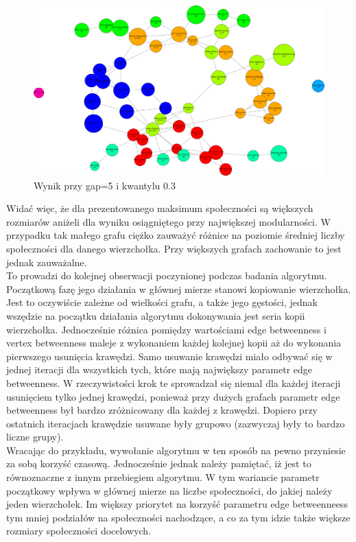 \documentclass{article}
\begin{document}
\begin{figure}[H]
\centering
\includegraphics[width=\textwidth]{images/is-sample-5.png}
\caption{Wynik przy gap=5 i kwantylu 0.3}
\end{figure}

Widać więc, że dla prezentowanego maksimum społeczności są większych rozmiarów aniżeli dla wyniku osiągniętego przy największej modularności. W przypadku tak małego grafu ciężko zauważyć różnice na poziomie średniej liczby społeczności dla danego wierzchołka. Przy większych grafach zachowanie to jest jednak zauważalne. \\

To prowadzi do kolejnej obserwacji poczynionej podczas badania algorytmu. Początkową fazę jego działania w głównej mierze stanowi kopiowanie wierzchołka. Jest to oczywiście zależne od wielkości grafu, a także jego gęstości, jednak wszędzie na początku działania algorytmu dokonywania jest seria kopii wierzchołka. Jednocześnie różnica pomiędzy wartościami edge betweenness i vertex betweenness maleje z wykonaniem każdej kolejnej kopii aż do wykonania pierwszego usunięcia krawędzi. Samo usuwanie krawędzi miało odbywać się w jednej iteracji dla wszystkich tych, które mają największy parametr edge betweenness. W rzeczywistości krok te sprowadzał się niemal dla każdej iteracji usunięciem tylko jednej krawędzi, ponieważ przy dużych grafach parametr edge betweenness był bardzo zróżnicowany dla każdej z krawędzi. Dopiero przy ostatnich iteracjach krawędzie usuwane były grupowo (zazwyczaj były to bardzo liczne grupy). \\

Wracając do przykładu, wywołanie algorytmu w ten sposób na pewno przyniesie za sobą korzyść czasową. Jednocześnie jednak należy pamiętać, iż jest to równoznaczne z innym przebiegiem algorytmu. W tym wariancie parametr początkowy wpływa w głównej mierze na liczbe społeczności, do jakiej należy jeden wierzchołek. Im większy priorytet na korzyść parametru edge betweenneess tym mniej podziałów na społeczności nachodzące, a co za tym idzie także większe rozmiary społeczności docelowych.\\
\end{document}
